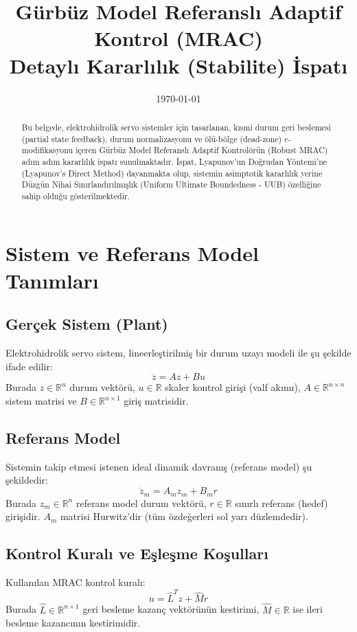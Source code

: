 \documentclass[12pt,a4paper]{article}
\title{\textbf{Gürbüz Model Referanslı Adaptif Kontrol (MRAC)\\Detaylı Kararlılık (Stabilite) İspatı}}
\author{}
\date{\today}
\begin{document}
\maketitle

\begin{abstract}
Bu belgede, elektrohidrolik servo sistemler için tasarlanan, kısmi durum geri beslemesi (partial state feedback), durum normalizasyonu ve ölü-bölge (dead-zone) $e$-modifikasyonu içeren Gürbüz Model Referanslı Adaptif Kontrolörün (Robust MRAC) adım adım kararlılık ispatı sunulmaktadır. İspat, Lyapunov'un Doğrudan Yöntemi'ne (Lyapunov's Direct Method) dayanmakta olup, sistemin asimptotik kararlılık yerine Düzgün Nihai Sınırlandırılmışlık (Uniform Ultimate Boundedness - UUB) özelliğine sahip olduğu gösterilmektedir.
\end{abstract}

\tableofcontents
\newpage

\section{Sistem ve Referans Model Tanımları}

\subsection{Gerçek Sistem (Plant)}
Elektrohidrolik servo sistem, lineerleştirilmiş bir durum uzayı modeli ile şu şekilde ifade edilir:
\begin{equation}
    \dot{z} = A z + B u
    \label{eq:plant}
\end{equation}
Burada $z \in \mathbb{R}^n$ durum vektörü, $u \in \mathbb{R}$ skaler kontrol girişi (valf akımı), $A \in \mathbb{R}^{n \times n}$ sistem matrisi ve $B \in \mathbb{R}^{n \times 1}$ giriş matrisidir.

\subsection{Referans Model}
Sistemin takip etmesi istenen ideal dinamik davranış (referans model) şu şekildedir:
\begin{equation}
    \dot{z}_m = A_m z_m + B_m r
    \label{eq:ref_model}
\end{equation}
Burada $z_m \in \mathbb{R}^n$ referans model durum vektörü, $r \in \mathbb{R}$ sınırlı referans (hedef) girişidir. $A_m$ matrisi Hurwitz'dir (tüm özdeğerleri sol yarı düzlemdedir).

\subsection{Kontrol Kuralı ve Eşleşme Koşulları}
Kullanılan MRAC kontrol kuralı:
\begin{equation}
    u = \hat{L}^T z + \hat{M} r
    \label{eq:control}
\end{equation}
Burada $\hat{L} \in \mathbb{R}^{n \times 1}$ geri besleme kazanç vektörünün kestirimi, $\hat{M} \in \mathbb{R}$ ise ileri besleme kazancının kestirimidir.
\end{document}
